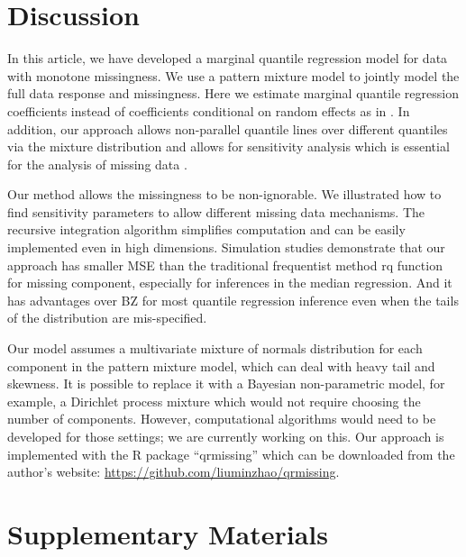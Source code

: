 \documentclass[useAMS,usenatbib,referee]{biom}
\begin{document}

\section{Discussion}
\label{ch3:sec:discussion}

In this article, we have developed a marginal quantile regression model
for data with monotone missingness. We use a pattern mixture model to
jointly model the full data response and missingness. Here we estimate
marginal quantile regression coefficients instead of coefficients
conditional on random effects as in \citet{yuan2010}. In addition, our
approach allows non-parallel quantile lines over different quantiles
via the mixture distribution and allows for sensitivity analysis which
is essential for the analysis of missing data \citep{nas2010}.

Our method allows the missingness to be non-ignorable.
We illustrated how to find sensitivity parameters to allow different missing data mechanisms.
The recursive integration algorithm simplifies computation and can be easily implemented even in high dimensions.
Simulation studies demonstrate that our approach has smaller MSE than the traditional frequentist method rq function for missing component, especially for inferences in the median regression.
And it has advantages over BZ for most quantile regression inference even when the tails of the distribution are mis-specified.

Our model assumes a multivariate mixture of normals distribution for each component in the pattern mixture model, which can deal with heavy tail and skewness.
It is possible to replace it with a Bayesian non-parametric model, for example, a Dirichlet process mixture which would not require choosing the number of components.
However, computational algorithms would need to be developed for those settings;  we are currently working on this.
Our approach is implemented with the R package ``qrmissing'' which can be downloaded from the author's website: \url{https://github.com/liuminzhao/qrmissing}.

\backmatter

\section*{Supplementary Materials}
\end{document}
